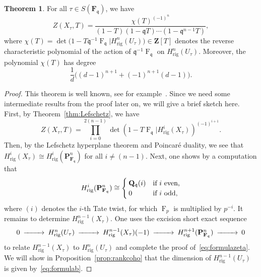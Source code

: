 \documentclass[a4paper,11pt]{article}
\numberwithin{equation}{section}
\newcommand{\ZZ}{\mathbf{Z}} %
\newcommand{\QQ}{\mathbf{Q}} %
\newcommand{\FF}{\mathbf{F}} %
\DeclareMathOperator{\Frob}{F}           %
\providecommand{\Hrig}{H_{\text{rig}}}  %
\theoremstyle{definition}
\newtheorem{thm}{Theorem}[section]
\begin{document}
\begin{thm} \label{thm:hypersurface} 
For all $\tau \in S(\FF_{\mathfrak{q}})$, we have
\begin{equation} \label{eq:formulazeta}
Z(X_{\tau},T) = \frac{\chi(T)^{(-1)^n}}{(1 - T) (1 - \mathfrak{q}T) \dotsm (1 - \mathfrak{q}^{n-1}T)},
\end{equation}
where 
$\chi(T) = \det \bigl( 1 - T \mathfrak{q}^{-1} \Frob_{\mathfrak{q}} | \Hrig^n(U_{\tau}) \bigr) \in \ZZ[T]$
denotes the reverse characteristic polynomial of the action of 
$\mathfrak{q}^{-1} \Frob_{\mathfrak{q}}$ on $\Hrig^n(U_{\tau})$. 
Moreover, the polynomial $\chi(T)$ has degree 
\begin{equation} \label{eq:formulab}
\frac{1}{d} \bigl((d-1)^{n+1} + (-1)^{n+1}(d-1) \bigr).
\end{equation}
\end{thm}

\begin{proof}
This theorem is well known, see for example~\citep{AbbottKedlayaRoe2006}. 
Since we need some intermediate results from the proof later on, we will 
give a brief sketch here. First, by Theorem~\ref{thm:Lefschetz}, we have 
\[
Z(X_{\tau},T) = \prod_{i=0}^{2(n-1)} \det(1- T \Frob_{\mathfrak{q}} | \Hrig^i(X_{\tau}))^{(-1)^{i+1}}.
\]
Then, by the Lefschetz hyperplane theorem and Poincar\'e duality, we see 
that $\Hrig^i(X_{\tau}) \cong \Hrig^i(\mathbf{P}^n_{\FF_{\mathfrak{q}}})$ 
for all $i \neq (n-1)$. Next, one shows by a computation that
\begin{equation} \label{eqn:projcoho}
\Hrig^i(\mathbf{P}^n_{\FF_{\mathfrak{q}}}) 
\cong 
\begin{cases}
\QQ_{\mathfrak{q}}(i) &\mbox{if $i$ even,} \\
$0$ &\mbox{if $i$ odd,} 
\end{cases} 
\end{equation}
where $(i)$ denotes the $i$-th Tate twist, for which $\Frob_p$ is multiplied 
by $p^{-i}$. It remains to determine $\Hrig^{n-1}(X_{\tau})$. One uses the 
excision short exact sequence
\begin{equation} \label{eqn:excision}
\begin{CD}
0 @>>> \Hrig^{n}(U_{\tau}) @>>> \Hrig^{n-1}(X_{\tau})(-1) @>>> \Hrig^{n+1}(\mathbf{P}^n_{\FF_{\mathfrak{q}}}) @>>> 0
\end{CD} 
\end{equation}
to relate $\Hrig^{n-1}(X_{\tau})$ to $\Hrig^{n}(U_{\tau})$ and complete 
the proof of~\eqref{eq:formulazeta}. We will show in Proposition~\ref{prop:rankcoho}
that the dimension of $\Hrig^{n-1}(U_{\tau})$ is given by~\eqref{eq:formulab}.
\end{proof}
\end{document}
